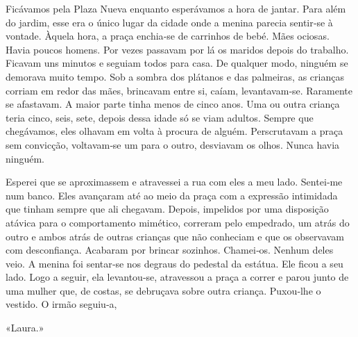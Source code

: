 Ficávamos pela Plaza Nueva enquanto esperávamos a hora de jantar. Para
além do jardim, esse era o único lugar da cidade onde a menina parecia
sentir­‑se à vontade. Àquela hora, a praça enchia­‑se de carrinhos de
bebé. Mães ociosas. Havia poucos homens. Por vezes passavam por lá os
maridos depois do trabalho. Ficavam uns minutos e seguiam todos para
casa. De qualquer modo, ninguém se demorava muito tempo. Sob a sombra
dos plátanos e das palmeiras, as crianças corriam em redor das mães,
brincavam entre si, caíam, levantavam­‑se. Raramente se afastavam. A
maior parte tinha menos de cinco anos. Uma ou outra criança teria cinco,
seis, sete, depois dessa idade só se viam adultos. Sempre que
chegávamos, eles olhavam em volta à procura de alguém. Perscrutavam a
praça sem convicção, voltavam­‑se um para o outro, desviavam os olhos.
Nunca havia ninguém.

Esperei que se aproximassem e atravessei a rua com eles a meu lado.
Sentei­‑me num banco. Eles avançaram até ao meio da praça com a
expressão intimidada que tinham sempre que ali chegavam. Depois,
impelidos por uma disposição atávica para o comportamento mimético,
correram pelo empedrado, um atrás do outro e ambos atrás de outras
crianças que não conheciam e que os observavam com desconfiança.
Acabaram por brincar sozinhos. Chamei­‑os. Nenhum deles veio. A menina
foi sentar­‑se nos degraus do pedestal da estátua. Ele ficou a seu lado.
Logo a seguir, ela levantou­‑se, atravessou a praça a correr e parou
junto de uma mulher que, de costas, se debruçava sobre outra criança.
Puxou­‑lhe o vestido. O irmão seguiu­‑a,

«Laura.»

